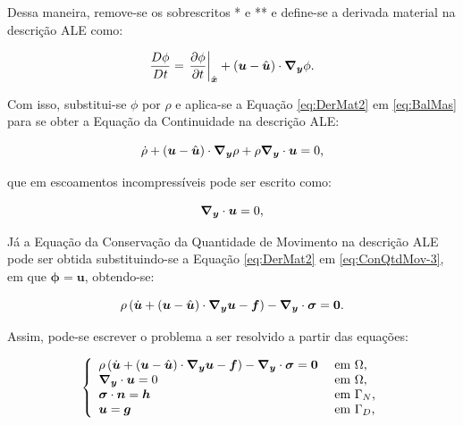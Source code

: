 Dessa maneira, remove-se os sobrescritos * e ** e define-se a derivada material na descrição ALE como:

\begin{equation}
    \frac{D\phi}{Dt}=\left.\frac{\partial{\phi}}{\partial{t}}\right|_{\hat{\boldsymbol{x}}}+(\boldsymbol{u}-\hat{\boldsymbol{u}})\cdot\boldsymbol{\nabla_y}\phi\text{.}
    \label{eq:DerMat2}
\end{equation}

Com isso, substitui-se $\phi$ por $\rho$ e aplica-se a Equação \eqref{eq:DerMat2} em \eqref{eq:BalMas} para se obter a Equação da Continuidade na descrição ALE:

\begin{equation}
    \dot{\rho}+(\boldsymbol{u}-\hat{\boldsymbol{u}})\cdot\boldsymbol{\nabla_y}\rho+\rho\boldsymbol{\nabla_y}\cdot\boldsymbol{u}=0\text{,}
\end{equation}

\noindent que em escoamentos incompressíveis pode ser escrito como:

\begin{equation}
    \boldsymbol{\nabla_y}\cdot\boldsymbol{u}=0\text{,}
    \label{eq:ALE-cont}
\end{equation}

Já a Equação da Conservação da Quantidade de Movimento na descrição ALE pode ser obtida substituindo-se a Equação \eqref{eq:DerMat2} em \eqref{eq:ConQtdMov-3}, em que $\mathbf{\phi}=\mathbf{u}$, obtendo-se:

\begin{equation}
    \rho\left({\dot{\boldsymbol{u}}+(\boldsymbol{u}-\hat{\boldsymbol{u}})\cdot\boldsymbol{\nabla_y}\boldsymbol{u}-\boldsymbol{f}}\right)-\boldsymbol{\nabla_y}\cdot\boldsymbol{\sigma}=\boldsymbol{0}\text{.}
    \label{eq:ALE-mov}
\end{equation}

Assim, pode-se escrever o problema a ser resolvido a partir das equações:

\begin{equation}
    \left\{
    \begin{array}{ll}
        \rho\left({\dot{\boldsymbol{u}}+(\boldsymbol{u}-\hat{\boldsymbol{u}})\cdot\boldsymbol{\nabla_y}\boldsymbol{u}-\boldsymbol{f}}\right)-\boldsymbol{\nabla_y}\cdot\boldsymbol{\sigma}=\boldsymbol{0} & \text{ em }\Omega\text{,}   \\
        \boldsymbol{\nabla_y}\cdot\boldsymbol{u}=0                                                                     & \text{ em }\Omega\text{,}   \\
        \boldsymbol{\sigma}\cdot\boldsymbol{n}=\boldsymbol{h}                                                              & \text{ em }\Gamma_N\text{,} \\
        \boldsymbol{u}=\boldsymbol{g}                                                                        & \text{ em }\Gamma_D\text{,}
    \end{array}
    \right.
    \label{eq:NS-ALE}
\end{equation}


